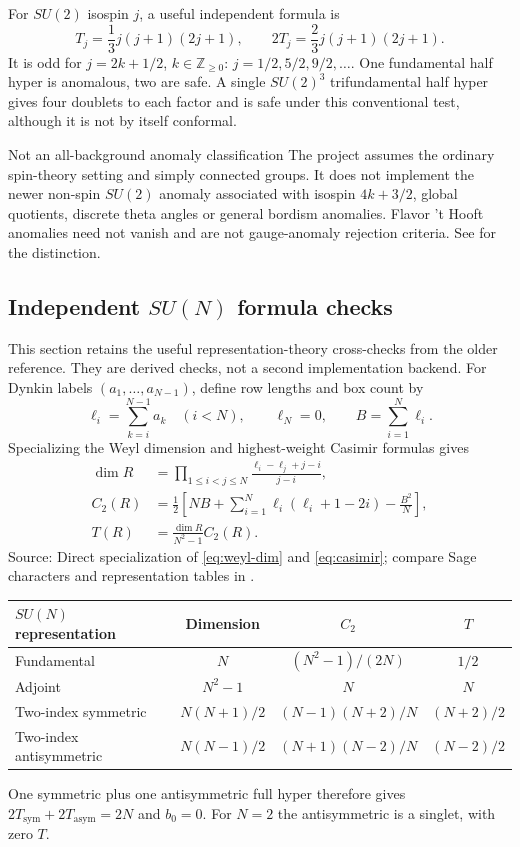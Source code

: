 \documentclass[11pt,a4paper]{article}
\numberwithin{equation}{section}
\newcommand{\ZZ}{\mathbb Z}
\newcommand{\src}[1]{{\small\color{muted}Source: #1.}\par}
\begin{document}
For $SU(2)$ isospin $j$, a useful independent formula is
\begin{equation}
 T_j=\frac13j(j+1)(2j+1),\qquad
 2T_j=\frac23j(j+1)(2j+1).
 \label{eq:su2-index}
\end{equation}
It is odd for $j=2k+1/2$, $k\in\ZZ_{\geq0}$: $j=1/2,5/2,9/2,\ldots$.
One fundamental half hyper is anomalous, two are safe. A single
$SU(2)^3$ trifundamental half hyper gives four doublets to each factor and is
safe under this conventional test, although it is not by itself conformal.

\begin{note}{Not an all-background anomaly classification}
The project assumes the ordinary spin-theory setting and simply connected
groups. It does not implement the newer non-spin $SU(2)$ anomaly associated with
isospin $4k+3/2$, global quotients, discrete theta angles or general bordism
anomalies. Flavor 't Hooft anomalies need not vanish and are not gauge-anomaly
rejection criteria. See \cite{www,df} for the distinction.
\end{note}

\clearpage
\subsection{Independent \texorpdfstring{$SU(N)$}{SU(N)} formula checks}
This section retains the useful representation-theory cross-checks from the
older reference. They are derived checks, not a second implementation backend.
For Dynkin labels $(a_1,\ldots,a_{N-1})$, define row lengths and box count by
\begin{equation}
 \ell_i=\sum_{k=i}^{N-1}a_k\quad(i<N),\qquad
 \ell_N=0,\qquad B=\sum_{i=1}^N\ell_i.
 \label{eq:rows}
\end{equation}
Specializing the Weyl dimension and highest-weight Casimir formulas gives
\begin{align}
 \dim R&=\prod_{1\leq i<j\leq N}
 \frac{\ell_i-\ell_j+j-i}{j-i},\label{eq:su-dim}\\
 C_2(R)&=\frac12\left[
 NB+\sum_{i=1}^N\ell_i(\ell_i+1-2i)-\frac{B^2}{N}\right],\label{eq:su-casimir}\\
 T(R)&=\frac{\dim R}{N^2-1}C_2(R).\label{eq:su-t}
\end{align}
\src{Direct specialization of \eqref{eq:weyl-dim} and \eqref{eq:casimir}; compare
Sage characters \cite{sage-chars} and representation tables in \cite{lieart}}

\begin{tabularx}{\textwidth}{@{}Yccc@{}}
\toprule
$SU(N)$ representation & Dimension & $C_2$ & $T$\\\midrule
Fundamental & $N$ & $(N^2-1)/(2N)$ & $1/2$\\
Adjoint & $N^2-1$ & $N$ & $N$\\
Two-index symmetric & $N(N+1)/2$ & $(N-1)(N+2)/N$ & $(N+2)/2$\\
Two-index antisymmetric & $N(N-1)/2$ & $(N+1)(N-2)/N$ & $(N-2)/2$\\
\bottomrule
\end{tabularx}
One symmetric plus one antisymmetric full hyper therefore gives
$2T_{\mathrm{sym}}+2T_{\mathrm{asym}}=2N$ and $b_0=0$.
For $N=2$ the antisymmetric is a singlet, with zero $T$.
\end{document}
